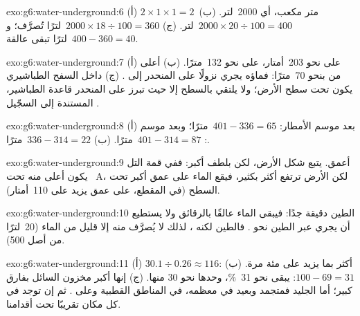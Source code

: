 \begin{solution}{exo:g6:water-underground:6}
(أ) $2 \times 1 \times 1 = 2$~متر مكعب، أي 2000~لتر.
(ب) $2000 \times 20 \div 100 = 400$~لتر. (ج) $2000 \times 18 \div 100 =
360$~لترًا تُصرَّف؛ و$400 - 360 = 40$~لترًا تبقى عالقة.
\end{solution}

\begin{solution}{exo:g6:water-underground:7}
(أ)  على  نحو 203~أمتار،  على  نحو 132~مترًا. (ب) 
أعلى من  بنحو 70~مترًا: فماؤه يجري نزولًا على المنحدر إلى .
(ج) داخل السفح الطباشيري يكون  تحت سطح الأرض؛ ولا يلتقي
بالسطح إلا حيث تبرز على المنحدر قاعدة الطباشير، المستندة إلى السجّيل
.
\end{solution}

\begin{solution}{exo:g6:water-underground:8}
(أ) بعد موسم الأمطار: $401 - 336 = 65$~مترًا؛ وبعد موسم :
$401 - 314 = 87$~مترًا. (ب) $336 - 314 = 22$~مترًا.
\end{solution}

\begin{solution}{exo:g6:water-underground:9}
أعمق.  يتبع شكل الأرض، لكن بلطف أكبر: ففي
قمة التل يكون أعلى منه تحت ~A، لكن الأرض ترتفع
أكثر بكثير، فيقع الماء على عمق أكبر تحت السطح (في المقطع،
على عمق يزيد على 110~أمتار).
\end{solution}

\begin{solution}{exo:g6:water-underground:10}
 الطين دقيقة جدًا: فيبقى الماء عالقًا بالرقائق ولا يستطيع أن
يجري عبر الطين نحو . فالطين  لكنه ، لذلك
لا يُصرَّف منه إلا قليل من الماء (20~لترًا من أصل 500).
\end{solution}

\begin{solution}{exo:g6:water-underground:11}
(أ) $30.1 \div 0.26 \approx 116$: أكثر بما يزيد على مئة مرة.
(ب) $100 - 69 = 31$: يبقى نحو 31~\%،  وحدها نحو 30
منها. (ج) إنها أكبر مخزون  السائل بفارق كبير؛ أما الجليد
فمتجمد وبعيد في معظمه، في المناطق القطبية وعلى . ثم إن
 توجد في كل مكان تقريبًا تحت أقدامنا.
\end{solution}

